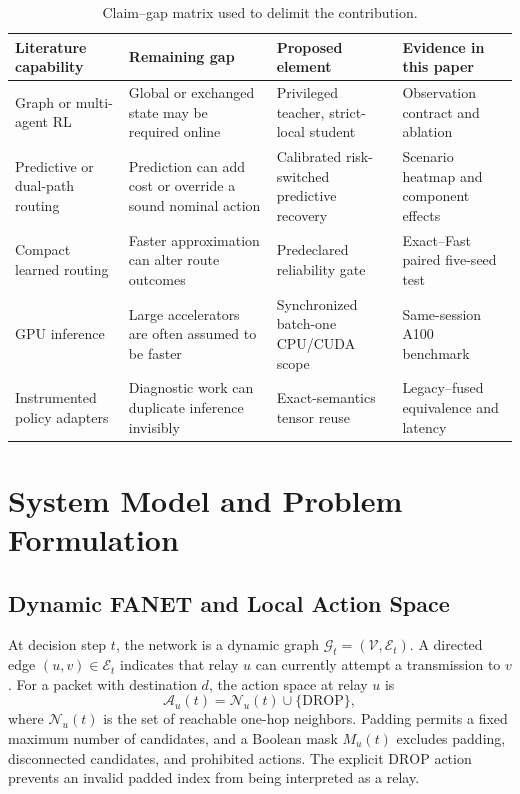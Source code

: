 \documentclass{ieeeaccess}
\newcommand{\drop}{\mathrm{DROP}}
\begin{document}
\begin{table}[t]
\caption{Claim--gap matrix used to delimit the contribution.}
\label{tab:novelty}
\centering\small
\begin{tabularx}{\textwidth}{p{}p{}p{}X}
\toprule
Literature capability & Remaining gap & Proposed element & Evidence in this paper \\
\midrule
Graph or multi-agent RL & Global or exchanged state may be required online & Privileged teacher, strict-local student & Observation contract and ablation \\
Predictive or dual-path routing & Prediction can add cost or override a sound nominal action & Calibrated risk-switched predictive recovery & Scenario heatmap and component effects \\
Compact learned routing & Faster approximation can alter route outcomes & Predeclared reliability gate & Exact--Fast paired five-seed test \\
GPU inference & Large accelerators are often assumed to be faster & Synchronized batch-one CPU/CUDA scope & Same-session A100 benchmark \\
Instrumented policy adapters & Diagnostic work can duplicate inference invisibly & Exact-semantics tensor reuse & Legacy--fused equivalence and latency \\
\bottomrule
\end{tabularx}
\end{table}

\section{System Model and Problem Formulation}

\subsection{Dynamic FANET and Local Action Space}

At decision step $t$, the network is a dynamic graph $\mathcal{G}_t=(\mathcal{V},\mathcal{E}_t)$. A directed edge $(u,v)\in\mathcal{E}_t$ indicates that relay $u$ can currently attempt a transmission to $v$. For a packet with destination $d$, the action space at relay $u$ is
\begin{equation}
\mathcal{A}_u(t)=\mathcal{N}_u(t)\cup\{\drop\},
\end{equation}
where $\mathcal{N}_u(t)$ is the set of reachable one-hop neighbors. Padding permits a fixed maximum number of candidates, and a Boolean mask $M_u(t)$ excludes padding, disconnected candidates, and prohibited actions. The explicit $\drop$ action prevents an invalid padded index from being interpreted as a relay.
\end{document}

